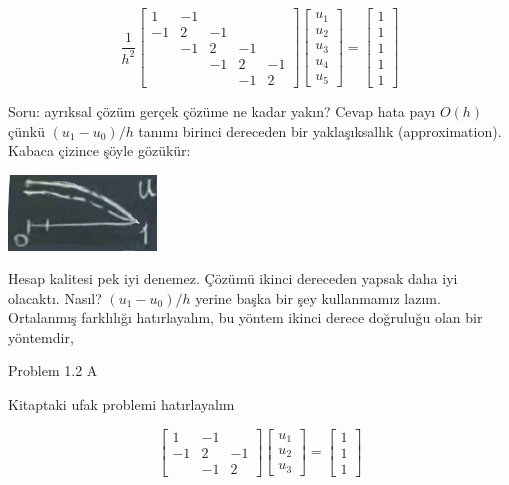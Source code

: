 \documentclass[12pt,fleqn]{article}\usepackage{../../common}
\begin{document}
$$ 
\frac{1}{h^2}
\left[\begin{array}{rrrrr}
1 & -1 & & & \\
-1 & 2 & -1 & & \\
& -1 & 2 & -1 & \\
& & -1 & 2 & -1 \\
& & & -1 & 2
\end{array}\right]
\left[\begin{array}{r}
u_1 \\
u_2 \\
u_3 \\
u_4 \\
u_5 
\end{array}\right] 
=
\left[\begin{array}{r}
1 \\
1 \\
1 \\
1 \\
1 
\end{array}\right]
 $$


Soru: ayrıksal çözüm gerçek çözüme ne kadar yakın? Cevap hata payı $O(h)$
çünkü $(u_1 - u_0) / h$ tanımı birinci dereceden bir yaklaşıksallık
(approximation). Kabaca çizince şöyle gözükür:

\includegraphics[height=2cm]{2_7.png}

Hesap kalitesi pek iyi denemez. Çözümü ikinci dereceden yapsak daha iyi
olacaktı. Nasıl? $(u_1 - u_0) / h$ yerine başka bir şey kullanmamız
lazım. Ortalanmış farklılığı hatırlayalım, bu yöntem ikinci derece
doğruluğu olan bir yöntemdir, 

Problem 1.2 A

Kitaptaki ufak problemi hatırlayalım

$$ 
\left[\begin{array}{rrr}
1 & -1 & \\
-1 & 2 & -1 \\
& -1 & 2
\end{array}\right]
\left[\begin{array}{r}
u_1 \\
u_2 \\
u_3 
\end{array}\right] 
=
\left[\begin{array}{r}
1 \\
1 \\
1 
\end{array}\right]
 $$
\end{document}
